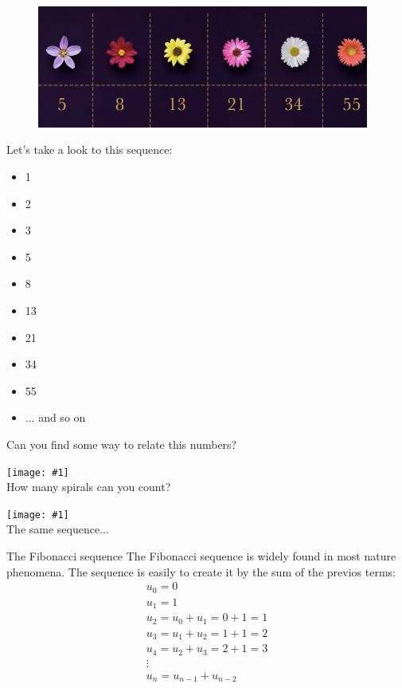 \documentclass[newPxFont]{beamer}
\newcommand \imageFrame[2]{
\begingroup
\begin{frame}
  \begin{center}
\texttt{[image: \#1]}\\
\Large #2
    \end{center}
\end{frame}
\endgroup
}
\begin{document}
\begin{frame}
\begin{figure}
  \includegraphics[width=4.3in]{fibonacci2}
\end{figure}
\end{frame}
\begin{frame}
Let's take a look to this sequence:
\begin{itemize}
  \item 1
  \item 2
  \item 3
  \item 5
  \item 8
  \item 13
  \item 21
  \item 34
  \item 55
  \item ... and so on
\end{itemize}
Can you find some way to relate this numbers?
\end{frame}
\imageFrame{pine1}{How many spirals can you count?}
\imageFrame{pine}{The same sequence...}
\begin{frame}{The Fibonacci sequence}
The \alert{Fibonacci} sequence is widely found in most nature phenomena. The sequence is easily to create it by the sum of the previos terms:
\begin{eqnarray*}
  u_0=0\\
  u_1=1\\
  u_2=u_0+u_1=0+1=1\\
  u_3=u_1+u_2=1+1=2\\
  u_4=u_2+u_3=2+1=3\\
  \vdots\\
  u_n=u_{n-1}+u_{n-2}
\end{eqnarray*}
\end{frame}
\end{document}
